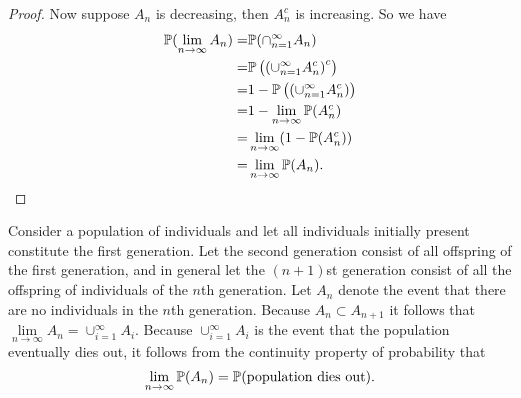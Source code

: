 \begin{proposition}
\begin{proof}
        Now suppose $A_n$ is decreasing, then $A_n^c$ is increasing. So we have 
        \begin{align*}
            \mathbb{P} (\lim\limits_{n\to\infty} A_n) = & \mathbb{P} (\cap_{n=1}^\infty A_n) \\ 
            = & \mathbb{P} \left( \left( \cup_{n=1}^\infty A_n^c \right)^c \right) \\ 
            = & 1 - \mathbb{P} \left( \left( \cup_{n=1}^\infty A_n^c \right) \right) \\ 
            = & 1 - \lim\limits_{n\to\infty} \mathbb{P} (A_n^c) \\ 
            = & \lim\limits_{n\to\infty} (1 - \mathbb{P} (A_n^c)) \\ 
            = & \lim\limits_{n\to\infty} \mathbb{P} (A_n).
        \end{align*}
    \end{proof}
\end{proposition}

\begin{example}
    Consider a population of individuals and let all individuals initially
    present constitute the first generation. Let the second generation consist of all offspring of the first generation, and in general let the $(n + 1)$st generation consist of all the offspring of individuals of the $n$th generation. Let $A_n$ denote the event that there are no individuals in the $n$th generation. Because $A_n \subset A_{n+1}$ it follows that $\lim\limits_{n\to\infty} A_n = \cup_{i=1}^\infty A_i$. Because $\cup_{i=1}^\infty A_i$ is the event that the population eventually dies out, it follows from the continuity property of probability that
    \begin{equation*}
        \lim_{n\to\infty} \mathbb{P} (A_n) = \mathbb{P} (\text{population dies out}).
    \end{equation*}
\end{example}
